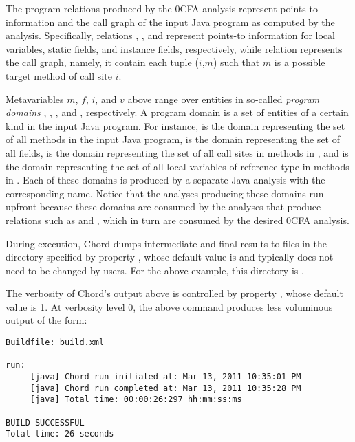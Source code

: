 The program relations produced by the 0CFA analysis represent points-to information and the
call graph of the input Java program as computed by the analysis.
Specifically, relations , , and  represent points-to information
for local variables, static fields, and instance fields, respectively,
while relation  represents the call graph, namely, it contain each tuple ($i$,$m$) such that
$m$ is a possible target method of call site $i$.

Metavariables $m$, $f$, $i$, and $v$ above range over entities in so-called {\it program domains} ,
, , and , respectively.
A program domain is a set of entities of a certain kind in the input Java program.  For instance,
 is the domain representing
the set of all methods in the input Java program,  is the domain representing the set of all fields,
 is the domain representing
the set of all call sites in methods in , and  is the domain representing the set of all local variables of reference type in methods in .
Each of these domains is produced by a separate Java analysis with the corresponding name.
Notice that the analyses producing these domains run upfront because these domains
are consumed by the analyses that produce relations such as  and
, which in turn are consumed by the desired 0CFA analysis.

During execution, Chord dumps intermediate and final results to files in the
directory specified by property , whose default value is 
and typically does not need to be changed by users.
For the above example, this directory is .

The verbosity of Chord's output above is controlled by property , whose
default value is 1.  At verbosity level 0, the above command produces less voluminous output
of the form:

\begin{framed}
{\small
\begin{verbatim}
Buildfile: build.xml

run:
     [java] Chord run initiated at: Mar 13, 2011 10:35:01 PM
     [java] Chord run completed at: Mar 13, 2011 10:35:28 PM
     [java] Total time: 00:00:26:297 hh:mm:ss:ms

BUILD SUCCESSFUL
Total time: 26 seconds
\end{verbatim}
}
\end{framed}


